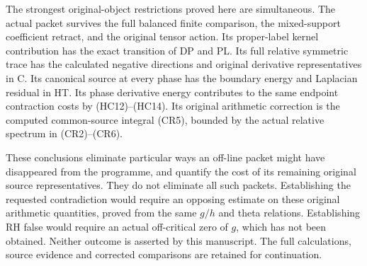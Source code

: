 The strongest original-object restrictions proved here are simultaneous.
The actual packet survives the full balanced finite comparison, the
mixed-support coefficient retract, and the original tensor action.
Its proper-label kernel contribution has the exact transition of DP
and PL. Its full relative symmetric trace has the calculated negative
directions and original derivative representatives in C. Its canonical
source at every phase has the boundary energy and Laplacian residual
in HT. Its phase derivative energy contributes to the same endpoint
contraction costs by (HC12)--(HC14). Its original arithmetic correction
is the computed common-source integral (CR5), bounded by the actual
relative spectrum in (CR2)--(CR6).

These conclusions eliminate particular ways an off-line packet might
have disappeared from the programme, and quantify the cost of its
remaining original source representatives. They do not eliminate all
such packets. Establishing the requested contradiction would require
an opposing estimate on these original arithmetic quantities, proved
from the same $g/h$ and theta relations. Establishing RH false would
require an actual off-critical zero of $g$, which has not been obtained.
Neither outcome is asserted by this manuscript. The full calculations,
source evidence and corrected comparisons are retained for continuation.
